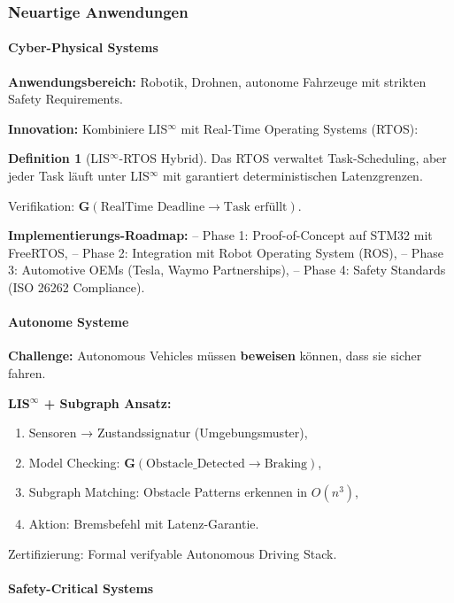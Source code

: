 \documentclass[a4paper,12pt]{article}
\theoremstyle{definition}
\newtheorem{definition}{Definition}
\begin{document}
\subsubsection{Neuartige Anwendungen}

\paragraph{Cyber-Physical Systems}

\textbf{Anwendungsbereich:} Robotik, Drohnen, autonome Fahrzeuge mit strikten Safety Requirements.

\textbf{Innovation:} Kombiniere LIS$^{\infty}$ mit Real-Time Operating Systems (RTOS):

\begin{definition}[LIS$^{\infty}$-RTOS Hybrid]
	Das RTOS verwaltet Task-Scheduling, aber jeder Task läuft unter LIS$^{\infty}$ mit garantiert deterministischen Latenzgrenzen.
	
	Verifikation: $\mathbf{G}(\text{RealTime Deadline} \to \text{Task erfüllt})$.
\end{definition}

\textbf{Implementierungs-Roadmap:}
-- Phase 1: Proof-of-Concept auf STM32 mit FreeRTOS,
-- Phase 2: Integration mit Robot Operating System (ROS),
-- Phase 3: Automotive OEMs (Tesla, Waymo Partnerships),
-- Phase 4: Safety Standards (ISO 26262 Compliance).

\paragraph{Autonome Systeme}

\textbf{Challenge:} Autonomous Vehicles müssen \textbf{beweisen} können, dass sie sicher fahren.

\textbf{LIS$^{\infty}$ + Subgraph Ansatz:}

\begin{enumerate}
	\item Sensoren → Zustandssignatur (Umgebungsmuster),
	\item Model Checking: $\mathbf{G}(\text{Obstacle\_Detected} \to \text{Braking})$,
	\item Subgraph Matching: Obstacle Patterns erkennen in $O(n^3)$,
	\item Aktion: Bremsbefehl mit Latenz-Garantie.
\end{enumerate}

Zertifizierung: Formal verifyable Autonomous Driving Stack.

\paragraph{Safety-Critical Systems}
\end{document}
